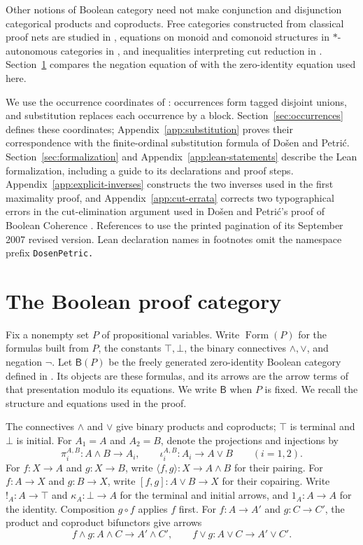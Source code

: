 \documentclass[11pt]{article}
\newcommand{\B}{\mathsf B}
\newcommand{\FormulaSet}{\operatorname{Form}}
\begin{document}
Other notions of Boolean category need not make conjunction and
disjunction categorical products and coproducts. Free categories constructed from classical proof nets
are studied in \cite[Theorem~3.5.4]{LSFree}, equations on monoid
and comonoid structures in $*$-autonomous categories in
\cite{Strassburger}, and inequalities interpreting cut reduction
in \cite{FP}. Section~\ref{sec:category} compares the negation
equation of \cite{FP} with the zero-identity equation used here.

We use the occurrence coordinates of \cite[\S9]{Notation}:
occurrences form tagged disjoint unions, and substitution replaces
each occurrence by a block. Section~\ref{sec:occurrences} defines
these coordinates; Appendix~\ref{app:substitution} proves their
correspondence with the finite-ordinal substitution formula of
Do\v{s}en and Petri\'c. Section~\ref{sec:formalization} and
Appendix~\ref{app:lean-statements} describe the Lean formalization,
including a guide to its declarations and proof steps.
Appendix~\ref{app:explicit-inverses} constructs the two inverses
used in the first maximality proof, and
Appendix~\ref{app:cut-errata} corrects two typographical errors
in the cut-elimination argument used in Do\v{s}en and Petri\'c's
proof of Boolean Coherence \cite{DP}.
References to \cite{DP} use the printed pagination of its
September 2007 revised version. Lean declaration names in footnotes
omit the namespace prefix \texttt{DosenPetric.}

\section{The Boolean proof category}\label{sec:category}

Fix a nonempty set $P$ of propositional variables. Write $\FormulaSet(P)$
for the formulas built from $P$, the constants $\top,\bot$, the binary
connectives $\wedge,\vee$, and negation $\neg$. Let $\B(P)$ be the
freely generated zero-identity Boolean category defined in
\cite[\S\S14.2--14.3]{DP}. Its objects are these formulas, and its
arrows are the arrow terms of that presentation modulo its equations.
We write $\B$ when $P$ is fixed. We recall the structure and equations
used in the proof.

The connectives $\wedge$ and $\vee$ give binary products and coproducts;
$\top$ is terminal and $\bot$ is initial. For $A_1=A$ and $A_2=B$,
denote the projections and injections by
\[
 \pi_i^{A,B}:A\wedge B\longrightarrow A_i,
 \qquad
 \iota_i^{A,B}:A_i\longrightarrow A\vee B
 \qquad(i=1,2).
\]
For $f:X\to A$ and $g:X\to B$, write
$\langle f,g\rangle:X\to A\wedge B$ for their pairing.
For $f:A\to X$ and $g:B\to X$, write
$[f,g]:A\vee B\to X$ for their copairing. Write
$!_A:A\to\top$ and $\kappa_A:\bot\to A$ for the terminal and initial
arrows, and $1_A:A\to A$ for the identity. Composition $g\circ f$
applies $f$ first. For $f:A\to A'$ and $g:C\to C'$, the product and
coproduct bifunctors give arrows
\[
 f\wedge g:A\wedge C\longrightarrow A'\wedge C',
 \qquad f\vee g:A\vee C\longrightarrow A'\vee C'.
\]
\end{document}
